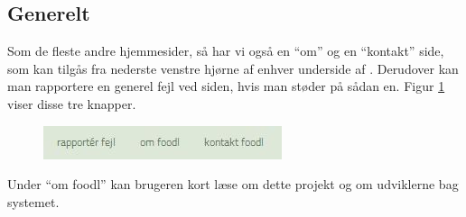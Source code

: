 \subsection{Generelt}
Som de fleste andre hjemmesider, så har vi også en ``om'' og en ``kontakt'' side, som kan tilgås fra nederste venstre hjørne af enhver underside af \Foodl{}. Derudover kan man rapportere en generel fejl ved siden, hvis man støder på sådan en. Figur \ref{fig:foodl-formaliteter} viser disse tre knapper.

\begin{figure}[H]
	\centering
	\includegraphics[scale=0.7]{billeder/foodl/formaliteter.jpg}
	\label{fig:foodl-formaliteter}
\end{figure}

Under ``om foodl'' kan brugeren kort læse om dette projekt og om udviklerne bag systemet.